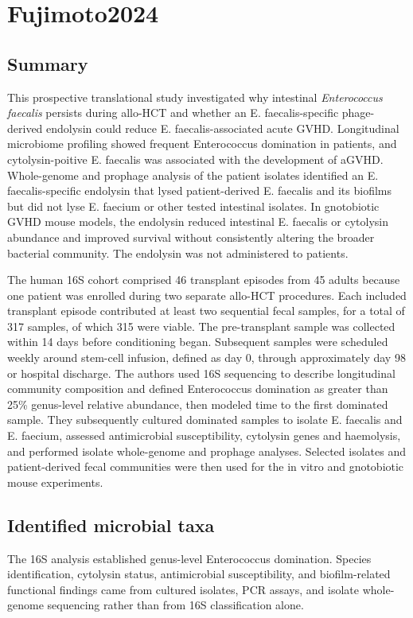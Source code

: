 \documentclass[11pt,a4paper]{article}
\begin{document}
\section{Fujimoto2024}
\subsection{Summary}
This prospective translational study investigated why intestinal \textit{Enterococcus faecalis} persists during allo-HCT and whether an E. faecalis-specific phage-derived endolysin could reduce E. faecalis-associated acute GVHD. Longitudinal microbiome profiling showed frequent Enterococcus domination in patients, and cytolysin-poitive  E. faecalis was associated with the development of aGVHD. Whole-genome and prophage analysis of the patient isolates identified an E. faecalis-specific endolysin that lysed patient-derived E. faecalis and its biofilms but did not lyse E. faecium or other tested intestinal isolates. In gnotobiotic GVHD mouse models, the endolysin reduced intestinal E. faecalis or cytolysin abundance and improved survival without consistently altering the broader bacterial community. The endolysin was not administered to patients.

The human 16S cohort comprised 46 transplant episodes from 45 adults because one patient was enrolled during two separate allo-HCT procedures. Each included transplant episode contributed at least two sequential fecal samples, for a total of 317 samples, of which 315 were viable. The pre-transplant sample was collected within 14 days before conditioning began. Subsequent samples were scheduled weekly around stem-cell infusion, defined as day 0, through approximately day 98 or hospital discharge. The authors used 16S sequencing to describe longitudinal community composition and defined Enterococcus domination as greater than 25\% genus-level relative abundance, then modeled time to the first dominated sample. They subsequently cultured dominated samples to isolate E. faecalis and E. faecium, assessed antimicrobial susceptibility, cytolysin genes and haemolysis, and performed isolate whole-genome and prophage analyses. Selected isolates and patient-derived fecal communities were then used for the in vitro and gnotobiotic mouse experiments.

\subsection{Identified microbial taxa}
The 16S analysis established genus-level Enterococcus domination. Species identification, cytolysin status, antimicrobial susceptibility, and biofilm-related functional findings came from cultured isolates, PCR assays, and isolate whole-genome sequencing rather than from 16S classification alone.
\end{document}
